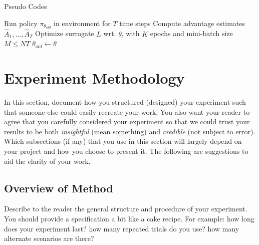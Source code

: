 \documentclass[conference]{IEEEtran}
\begin{document}
\begin{algorithm}
	\caption{Pseudo Codes}\label{pseudo:ppo}
	\begin{algorithmic}[1]
				\State Run policy $\pi_{\theta_{old}}$ in environment for $T$ time steps
				\State Compute advantage estimates $\hat{A}_{1},\ldots,\hat{A}_{T}$
			\EndFor
			\State Optimize surrogate $L$ wrt. $\theta$, with $K$ epochs and mini-batch size $M\leq NT$
			\State $\theta_{old}\leftarrow\theta$
		\EndFor
	\end{algorithmic} 
\end{algorithm}

\section{Experiment Methodology}
In this section, document how you structured (designed) your experiment such that someone else could easily recreate your work.  You also want your reader to agree that you carefully considered your experiment so that we could trust your results to be both \emph{insightful} (mean something) and \emph{credible} (not subject to error).  Which subsections (if any) that you use in this section will largely depend on your project and how you choose to present it.  The following are suggestions to aid the clarity of your work.

\subsection{Overview of Method}
Describe to the reader the general structure and procedure of your experiment. You should provide a specification a bit like a cake recipe.  For example: how long does your experiment last?  how many repeated trials do you use?  how many alternate scenarios are there?
\end{document}
